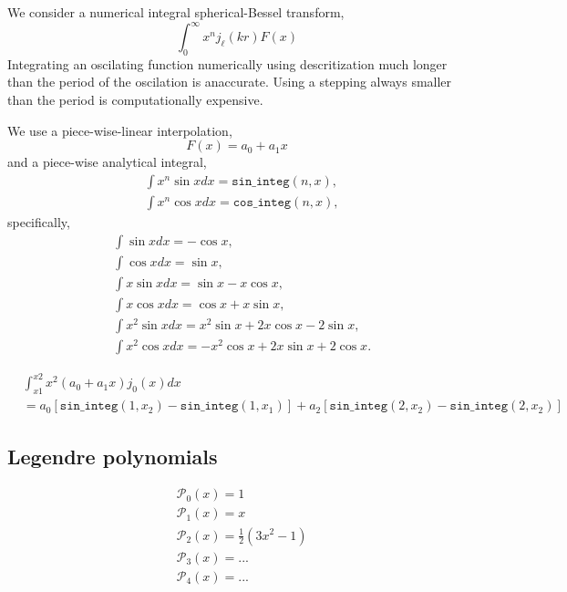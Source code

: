 \documentclass[a4paper,11pt, fleqn]{article}
\begin{document}
We consider a numerical integral spherical-Bessel transform,
%
\begin{equation}
  \int_0^\infty x^n j_\ell(kr) F(x)
\end{equation}
%
Integrating an oscilating function numerically using descritization
much longer than the period of the oscilation is anaccurate. Using a
stepping always smaller than the period is computationally
expensive.

We use a piece-wise-linear interpolation,
%
\begin{equation}
  F(x) = a_0 + a_1 x
\end{equation}
%
and a piece-wise analytical integral,
%
\begin{align}
  &\int x^n \sin x dx = \texttt{sin\_integ}(n, x),\\
  &\int x^n \cos x dx = \texttt{cos\_integ}(n, x),
\end{align}
%
specifically,
%
\begin{align}
  &\int \sin x dx = -\cos x,\\
  &\int \cos x dx = \sin x,\\
  &\int x \sin x dx = \sin x - x \cos x,\\
  &\int x \cos x dx = \cos x + x \sin x,\\
  &\int x^2 \sin x dx = x^2 \sin x + 2 x \cos x - 2 \sin x,\\
  &\int x^2 \cos x dx = -x^2 \cos x + 2 x \sin x + 2 \cos x.
\end{align}
%

\vspace{5mm}

\begin{equation}\begin{split}
    &\int_{x1}^{x2} x^2 (a_0 + a_1 x) j_0(x) dx \\
    &=
    a_0 [\texttt{sin\_integ}(1, x_2) - \texttt{sin\_integ}(1, x_1)]
    + a_2 [\texttt{sin\_integ}(2, x_2) - \texttt{sin\_integ}(2, x_2)]
\end{split}\end{equation}

\clearpage
\subsection{Legendre polynomials}
\label{sec:legendre}

\begin{align}
  &\mathcal{P}_0(x) = 1\\
  &\mathcal{P}_1(x) = x\\
  &\mathcal{P}_2(x) = \frac{1}{2} (3x^2 - 1)\\
  &\mathcal{P}_3(x) = ...\\
  &\mathcal{P}_4(x) = ...
\end{align}
\end{document}
